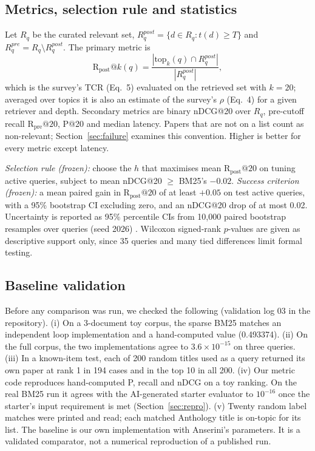 \documentclass[acmsmall]{acmart}
\makeatletter
\newcommand{\Rpost}{\mathrm{R}_{\text{post}}@20}
\makeatother
\begin{document}
\subsection{Metrics, selection rule and statistics}
Let $R_q$ be the curated relevant set, $R_q^{post}=\{d\in R_q: t(d)\geq T\}$ and $R_q^{pre}=R_q\setminus R_q^{post}$. The primary metric is
\begin{equation}\label{eq:rpost}
\mathrm{R}_{\text{post}}@k(q)=\frac{|\mathrm{top}_k(q)\cap R_q^{post}|}{|R_q^{post}|},
\end{equation}
which is the survey's TCR (Eq.~5) evaluated on the retrieved set with $k=20$; averaged over topics it is also an estimate of the survey's $\rho$ (Eq.~4) for a given retriever and depth. Secondary metrics are binary nDCG@20 over $R_q$, pre-cutoff recall $\mathrm{R}_{\text{pre}}@20$, P@20 and median latency. Papers that are not on a list count as non-relevant; Section~\ref{sec:failure} examines this convention. Higher is better for every metric except latency.

\emph{Selection rule (frozen):} choose the $h$ that maximises mean $\Rpost$ on tuning active queries, subject to mean nDCG@20 $\geq$ BM25's $-0.02$.
\emph{Success criterion (frozen):} a mean paired gain in $\Rpost$ of at least $+0.05$ on test active queries, with a 95\% bootstrap CI excluding zero, and an nDCG@20 drop of at most 0.02. Uncertainty is reported as 95\% percentile CIs from 10,000 paired bootstrap resamples over queries (seed 2026) \cite{efron1993bootstrap}. Wilcoxon signed-rank $p$-values are given as descriptive support only, since 35 queries and many tied differences limit formal testing.

\subsection{Baseline validation}\label{sec:validation}
Before any comparison was run, we checked the following (validation log 03 in the repository).
(i) On a 3-document toy corpus, the sparse BM25 matches an independent loop implementation and a hand-computed value (0.493374).
(ii) On the full corpus, the two implementations agree to $3.6\times10^{-15}$ on three queries.
(iii) In a known-item test, each of 200 random titles used as a query returned its own paper at rank 1 in 194 cases and in the top 10 in all 200.
(iv) Our metric code reproduces hand-computed P, recall and nDCG on a toy ranking. On the real BM25 run it agrees with the AI-generated starter evaluator to $10^{-16}$ once the starter's input requirement is met (Section~\ref{sec:repro}).
(v) Twenty random label matches were printed and read; each matched Anthology title is on-topic for its list.
The baseline is our own implementation with Anserini's parameters. It is a validated comparator, not a numerical reproduction of a published run.
\end{document}

